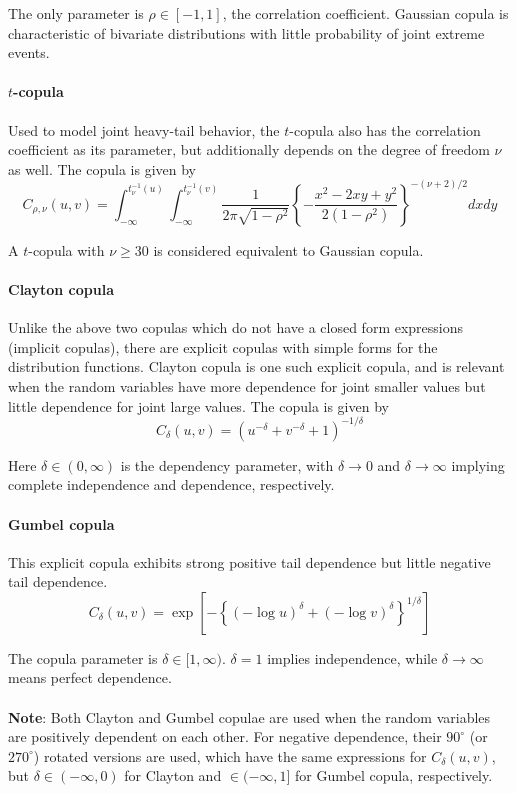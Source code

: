 \documentclass[11pt]{llncs}
\begin{document}
The only parameter is $\rho\in[-1,1]$, the correlation coefficient. Gaussian copula is characteristic of bivariate distributions with little probability of joint extreme events.

\paragraph{$t$-copula} Used to model joint heavy-tail behavior, the $t$-copula also has the correlation coefficient as its parameter, but additionally depends on the degree of freedom $\nu$ as well. The copula is given by
$$ C_{\rho,\nu}(u,v) = \int_{-\infty}^{t_\nu^{-1}(u)}\int_{-\infty}^{t_\nu^{-1}(v)} \frac{1}{2\pi\sqrt{1-\rho^2}} \left\{-\frac{x^2-2xy+y^2}{2(1-\rho^2)}\right\}^{-(\nu+2)/2}dxdy $$

A $t$-copula with $\nu\geq 30$ is considered equivalent to Gaussian copula.

\paragraph{Clayton copula} Unlike the above two copulas which do not have a closed form expressions (implicit copulas),  there are explicit copulas with simple forms for the distribution functions. Clayton copula is one such explicit copula, and is relevant when the random variables have more dependence for joint smaller values but little dependence for joint large values. The copula is given by
$$ C_\delta (u,v) = (u^{-\delta}+v^{-\delta}+1)^{-1/\delta} $$

Here $\delta\in(0,\infty)$ is the dependency parameter, with $\delta\rightarrow 0$ and $\delta\rightarrow\infty$ implying complete independence and dependence, respectively.

\paragraph{Gumbel copula} This explicit copula exhibits strong positive tail dependence but little negative tail dependence.
$$ C_\delta(u,v) = \exp\left[-\left\{(-\log u)^\delta+(-\log v)^\delta\right\}^{1/\delta}\right] $$

The copula parameter is $\delta\in[1,\infty)$. $\delta=1$ implies independence, while $\delta\rightarrow\infty$ means perfect dependence.

\paragraph{}\textbf{Note}: Both Clayton and Gumbel copulae are used when the random variables are positively dependent on each other. For negative dependence, their $90^\circ$ (or $270^\circ$) rotated versions are used, which have the same expressions for $C_\delta(u,v)$, but $\delta\in(-\infty,0)$ for Clayton and $\in (-\infty,1]$ for Gumbel copula, respectively.
\end{document}
